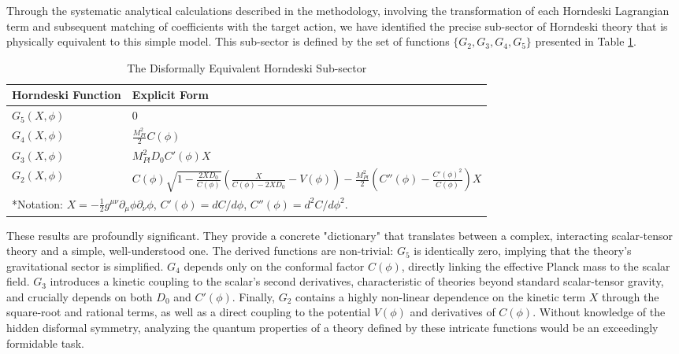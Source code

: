 \documentclass[twocolumn]{aastex631}
\begin{document}
Through the systematic analytical calculations described in the methodology, involving the transformation of each Horndeski Lagrangian term and subsequent matching of coefficients with the target action, we have identified the precise sub-sector of Horndeski theory that is physically equivalent to this simple model. This sub-sector is defined by the set of functions $\{G_2, G_3, G_4, G_5\}$ presented in Table \ref{tab:horndeski_functions}.

\begin{table}
\caption{The Disformally Equivalent Horndeski Sub-sector}
\label{tab:horndeski_functions}
\centering
\begin{tabular}{|l|p{}|}
\hline
\textbf{Horndeski Function} & \textbf{Explicit Form} \\
\hline
$G_5(X, \phi)$ & $0$ \\
$G_4(X, \phi)$ & $\frac{M_{Pl}^2}{2} C(\phi)$ \\
$G_3(X, \phi)$ & $M_{Pl}^2 D_0 C'(\phi) X$ \\
$G_2(X, \phi)$ & $C(\phi) \sqrt{1 - \frac{2XD_0}{C(\phi)}} \left( \frac{X}{C(\phi)-2XD_0} - V(\phi) \right) - \frac{M_{Pl}^2}{2} \left( C''(\phi) - \frac{C'(\phi)^2}{C(\phi)} \right) X$ \\
\hline
\multicolumn{2}{p{0.7\textwidth}}{*Notation: $X = -\frac{1}{2}g^{\mu\nu}\partial_\mu\phi\partial_\nu\phi$, $C'(\phi) = dC/d\phi$, $C''(\phi) = d^2C/d\phi^2$.} \\
\end{tabular}
\end{table}

These results are profoundly significant. They provide a concrete "dictionary" that translates between a complex, interacting scalar-tensor theory and a simple, well-understood one. The derived functions are non-trivial: $G_5$ is identically zero, implying that the theory's gravitational sector is simplified. $G_4$ depends only on the conformal factor $C(\phi)$, directly linking the effective Planck mass to the scalar field. $G_3$ introduces a kinetic coupling to the scalar's second derivatives, characteristic of theories beyond standard scalar-tensor gravity, and crucially depends on both $D_0$ and $C'(\phi)$. Finally, $G_2$ contains a highly non-linear dependence on the kinetic term $X$ through the square-root and rational terms, as well as a direct coupling to the potential $V(\phi)$ and derivatives of $C(\phi)$. Without knowledge of the hidden disformal symmetry, analyzing the quantum properties of a theory defined by these intricate functions would be an exceedingly formidable task.
\end{document}
